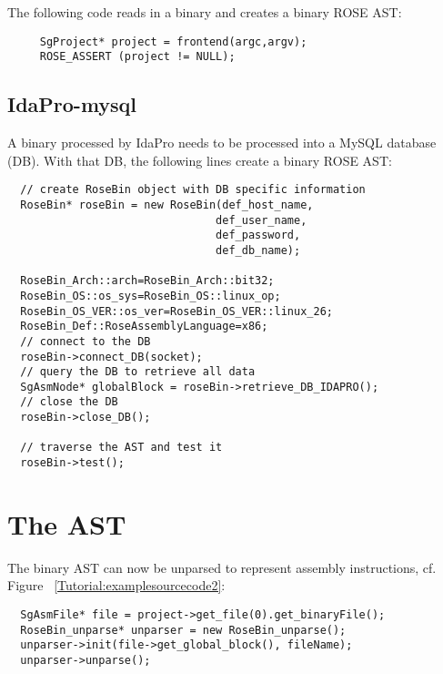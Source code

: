 The following code reads in a binary and creates a binary ROSE AST:

{\mySmallFontSize
\begin{verbatim}
     SgProject* project = frontend(argc,argv);
     ROSE_ASSERT (project != NULL);
\end{verbatim}
}


\subsection{IdaPro-mysql}

A binary processed by IdaPro needs to be processed into a MySQL database (DB). With that DB,
the following lines create a binary ROSE AST:


{\mySmallFontSize
\begin{verbatim}
  // create RoseBin object with DB specific information 
  RoseBin* roseBin = new RoseBin(def_host_name,
                                def_user_name,
                                def_password,
                                def_db_name);

  RoseBin_Arch::arch=RoseBin_Arch::bit32;
  RoseBin_OS::os_sys=RoseBin_OS::linux_op;
  RoseBin_OS_VER::os_ver=RoseBin_OS_VER::linux_26;
  RoseBin_Def::RoseAssemblyLanguage=x86;
  // connect to the DB
  roseBin->connect_DB(socket);
  // query the DB to retrieve all data
  SgAsmNode* globalBlock = roseBin->retrieve_DB_IDAPRO();
  // close the DB
  roseBin->close_DB();

  // traverse the AST and test it
  roseBin->test();
\end{verbatim}
}




\section{The AST}

The binary AST can now be unparsed to represent assembly instructions, cf. Figure ~\ref{Tutorial:examplesourcecode2}:

{\mySmallFontSize
\begin{verbatim}
  SgAsmFile* file = project->get_file(0).get_binaryFile();
  RoseBin_unparse* unparser = new RoseBin_unparse();
  unparser->init(file->get_global_block(), fileName);
  unparser->unparse();
\end{verbatim}
}


